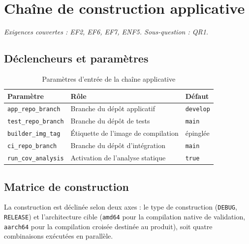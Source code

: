 \section{Chaîne de construction applicative}
\label{sec:impl-pipeline-app}

\emph{Exigences couvertes : EF2, EF6, EF7, ENF5. Sous-question : QR1.}

\subsection{Déclencheurs et paramètres}

\begin{table}[H]
\centering
\caption{Paramètres d'entrée de la chaîne applicative}
\label{tab:impl-parametres-app}
\begin{tabularx}{\textwidth}{@{}l X l@{}}
\toprule
\textbf{Paramètre} & \textbf{Rôle} & \textbf{Défaut} \\
\midrule
\texttt{app\_repo\_branch} & Branche du dépôt applicatif & \texttt{develop} \\
\texttt{test\_repo\_branch} & Branche du dépôt de tests & \texttt{main} \\
\texttt{builder\_img\_tag} & Étiquette de l'image de compilation & épinglée \\
\texttt{ci\_repo\_branch} & Branche du dépôt d'intégration & \texttt{main} \\
\texttt{run\_cov\_analysis} & Activation de l'analyse statique & \texttt{true} \\
\bottomrule
\end{tabularx}
\end{table}

\subsection{Matrice de construction}
\label{ssec:impl-matrice}

La construction est déclinée selon deux axes : le type de construction
(\texttt{DEBUG}, \texttt{RELEASE}) et l'architecture cible (\texttt{amd64} pour
la compilation native de validation, \texttt{aarch64} pour la compilation
croisée destinée au produit), soit quatre combinaisons exécutées en parallèle.

